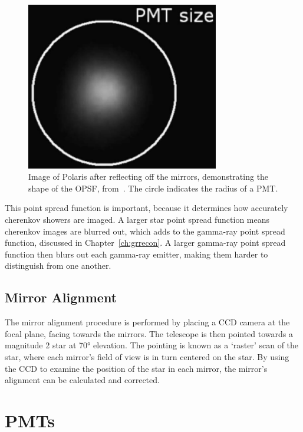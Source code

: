 \begin{figure}[ht]
  \centering
  \includegraphics[width=0.75\textwidth]{images/mirror_polaris.eps}
  \caption[Polaris PSF]{
    Image of Polaris after reflecting off the mirrors, demonstrating the shape of the OPSF, from~\cite{Veritas_Detector}.
    The circle indicates the radius of a PMT.}
  \label{fig:mirrorpolaris}
\end{figure}

This point spread function is important, because it determines how accurately cherenkov showers are imaged.
A larger star point spread function means cherenkov images are blurred out, which adds to the gamma-ray point spread function, discussed in Chapter~\ref{ch:grrecon}.
A larger gamma-ray point spread function then blurs out each gamma-ray emitter, making them harder to distinguish from one another.


\subsection{Mirror Alignment}
The mirror alignment procedure is performed by placing a CCD camera at the focal plane, facing towards the mirrors.
The telescope is then pointed towards a magnitude 2 star at \nicetilde{}\ang{70} elevation.
The pointing is known as a `raster' scan of the star, where each mirror's field of view is in turn centered on the star.
By using the CCD to examine the position of the star in each mirror, the mirror's alignment can be calculated and corrected.



\section{PMTs}\label{sec:pmts}

